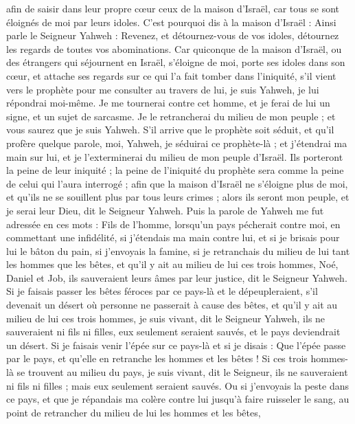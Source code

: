 \begin{multicols}{2}
afin de saisir dans leur propre cœur ceux de la maison d'Israël, car tous se sont éloignés de moi par leurs idoles.
C'est pourquoi dis à la maison d'Israël : Ainsi parle le Seigneur Yahweh : Revenez, et détournez-vous de vos idoles, détournez les regards de toutes vos abominations\FTNT{}.
Car quiconque de la maison d'Israël, ou des étrangers qui séjournent en Israël, s’éloigne de moi, porte ses idoles dans son cœur, et attache ses regards sur ce qui l’a fait tomber dans l’iniquité, s'il vient vers le prophète pour me consulter au travers de lui, je suis Yahweh, je lui répondrai moi-même.
Je me tournerai contre cet homme\FTNT{}, et je ferai de lui un signe, et un sujet de sarcasme\FTNT{}. Je le retrancherai du milieu de mon peuple ; et vous saurez que je suis Yahweh.
S'il arrive que le prophète soit séduit, et qu'il profère quelque parole, moi, Yahweh, je séduirai ce prophète-là\FTNT{} ; et j'étendrai ma main sur lui, et je l'exterminerai du milieu de mon peuple d'Israël.
Ils porteront la peine de leur iniquité ; la peine de l'iniquité du prophète sera comme la peine de celui qui l'aura interrogé ;
afin que la maison d'Israël ne s'éloigne plus de moi, et qu'ils ne se souillent plus par tous leurs crimes\FTNT{} ; alors ils seront mon peuple, et je serai leur Dieu, dit le Seigneur Yahweh.
Puis la parole de Yahweh me fut adressée en ces mots :
Fils de l’homme, lorsqu'un pays pécherait contre moi, en commettant une infidélité, si j’étendais ma main contre lui, et si je brisais pour lui le bâton du pain, si j’envoyais la famine, si je retranchais du milieu de lui tant les hommes que les bêtes,
et qu’il y ait au milieu de lui ces trois hommes, Noé, Daniel et Job, ils sauveraient leurs âmes par leur justice, dit le Seigneur Yahweh.
Si je faisais passer les bêtes féroces par ce pays-là et le dépeupleraient, s’il devenait un désert où personne ne passerait à cause des bêtes,
et qu’il y ait au milieu de lui ces trois hommes, je suis vivant, dit le Seigneur Yahweh, ils ne sauveraient ni fils ni filles, eux seulement seraient sauvés, et le pays deviendrait un désert.
Si je faisais venir l'épée sur ce pays-là et si je disais : Que l'épée passe par le pays, et qu'elle en retranche les hommes et les bêtes !
Si ces trois hommes-là se trouvent au milieu du pays, je suis vivant, dit le Seigneur, ils ne sauveraient ni fils ni filles ; mais eux seulement seraient sauvés.
Ou si j'envoyais la peste dans ce pays, et que je répandais ma colère contre lui jusqu’à faire ruisseler le sang, au point de retrancher du milieu de lui les hommes et les bêtes,

\end{multicols}

